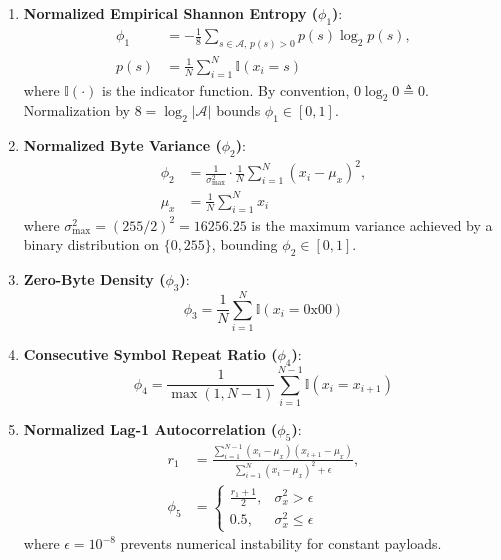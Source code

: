 \documentclass[conference]{IEEEtran}
\begin{document}
\begin{enumerate}
    \item \textbf{Normalized Empirical Shannon Entropy ($\phi_1$)}:
    \begin{equation}
        \begin{split}
        \phi_1 &= -\frac{1}{8} \sum_{s \in \mathcal{A},\, p(s) > 0} p(s) \log_2 p(s), \\
        p(s) &= \frac{1}{N} \sum_{i=1}^N \mathbb{I}(x_i = s)
        \end{split}
        \label{eq:entropy}
    \end{equation}
    where $\mathbb{I}(\cdot)$ is the indicator function. By convention, $0 \log_2 0 \triangleq 0$. Normalization by $8 = \log_2 |\mathcal{A}|$ bounds $\phi_1 \in [0, 1]$.
    
    \item \textbf{Normalized Byte Variance ($\phi_2$)}:
    \begin{equation}
        \begin{split}
        \phi_2 &= \frac{1}{\sigma^2_{\max}} \cdot \frac{1}{N}\sum_{i=1}^N \left( x_i - \mu_x \right)^2, \\
        \mu_x &= \frac{1}{N}\sum_{i=1}^N x_i
        \end{split}
        \label{eq:variance}
    \end{equation}
    where $\sigma^2_{\max} = (255/2)^2 = 16256.25$ is the maximum variance achieved by a binary distribution on $\{0, 255\}$, bounding $\phi_2 \in [0, 1]$.
    
    \item \textbf{Zero-Byte Density ($\phi_3$)}:
    \begin{equation}
        \phi_3 = \frac{1}{N} \sum_{i=1}^N \mathbb{I}(x_i = 0\mathrm{x}00)
    \end{equation}
    
    \item \textbf{Consecutive Symbol Repeat Ratio ($\phi_4$)}:
    \begin{equation}
        \phi_4 = \frac{1}{\max(1, N-1)} \sum_{i=1}^{N-1} \mathbb{I}(x_i = x_{i+1})
    \end{equation}
    
    \item \textbf{Normalized Lag-1 Autocorrelation ($\phi_5$)}:
    \begin{equation}
        \begin{split}
        r_1 &= \frac{\sum_{i=1}^{N-1} (x_i - \mu_x)(x_{i+1} - \mu_x)}{\sum_{i=1}^N (x_i - \mu_x)^2 + \epsilon}, \\
        \phi_5 &= \begin{cases} \frac{r_1 + 1}{2}, & \sigma_x^2 > \epsilon \\ 0.5, & \sigma_x^2 \le \epsilon \end{cases}
        \end{split}
    \end{equation}
    where $\epsilon = 10^{-8}$ prevents numerical instability for constant payloads.
    

\end{enumerate}
\end{document}
